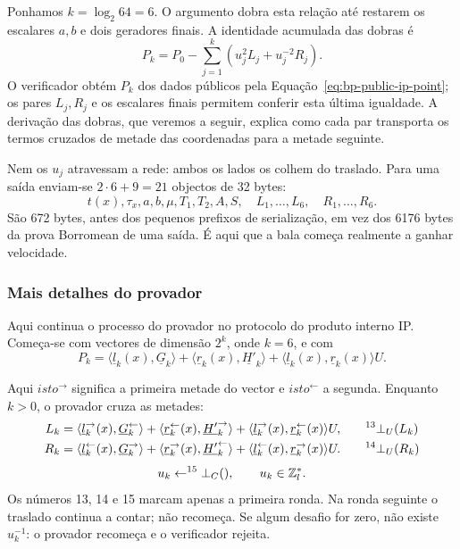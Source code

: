 Ponhamos \(k=\log_2 64=6\). O argumento dobra esta relação até
restarem os escalares \(a,b\) e dois geradores finais. A identidade
acumulada das dobras é
\begin{equation}
 P_k=P_0-\sum_{j=1}^{k}
              \left(u_j^2L_j+u_j^{-2}R_j\right).
 \label{eq:bp-ip-recursion}
\end{equation}
O verificador obtém \(P_k\) dos dados públicos pela
Equação~\eqref{eq:bp-public-ip-point}; os pares \(L_j,R_j\) e os
escalares finais permitem conferir esta última igualdade. A derivação
das dobras, que veremos a seguir, explica como cada par transporta os
termos cruzados de metade das coordenadas para a metade seguinte.

Nem os \(u_j\) atravessam a rede: ambos os lados os colhem do traslado. Para
uma saída enviam-se \(2\cdot6+9=21\) objectos de 32 bytes:
\[
 t(x),\tau_x,a,b,\mu,T_1,T_2,A,S,\quad
 L_1,\ldots,L_6,\quad R_1,\ldots,R_6.
\]
São 672 bytes, antes dos pequenos prefixos de serialização, em vez dos 6176
bytes da prova Borromean de uma saída. É aqui que a bala começa realmente a
ganhar velocidade.

\subsubsection{Mais detalhes do provador}
\label{sec:bullet_detalhes}

Aqui continua o processo do provador no protocolo do produto interno IP.
Começa-se com vectores de dimensão \(2^k\), onde \(k=6\), e com
\[
 P_k=\langle\underline l_k(x),\underline G_k\rangle+
     \langle\underline r_k(x),\underline{H'}_k\rangle+
     \langle\underline l_k(x),\underline r_k(x)\rangle U.
\]

Aqui \(isto^{\rightarrow}\) significa a primeira metade do vector e
\(isto^{\leftarrow}\) a segunda. Enquanto \(k>0\), o provador cruza as metades:
\begin{align*}
L_k={}&
 \langle\underline l_k^{\rightarrow}(x),\underline G_k^{\leftarrow}\rangle+
 \langle\underline r_k^{\leftarrow}(x),\underline{H'}_k^{\rightarrow}\rangle+
 \langle\underline l_k^{\rightarrow}(x),
        \underline r_k^{\leftarrow}(x)\rangle U,
 &\quad&^{13}_{\ }\bot_U(L_k)\\
R_k={}&
 \langle\underline l_k^{\leftarrow}(x),\underline G_k^{\rightarrow}\rangle+
 \langle\underline r_k^{\rightarrow}(x),\underline{H'}_k^{\leftarrow}\rangle+
 \langle\underline l_k^{\leftarrow}(x),
        \underline r_k^{\rightarrow}(x)\rangle U.
 &\quad&^{14}_{\ }\bot_U(R_k)
\end{align*}
\[
 u_k\leftarrow^{15}_{\ }\bot_C(),\qquad u_k\in\mathbb Z_l^*.
\]
Os números 13, 14 e 15 marcam apenas a primeira ronda. Na ronda seguinte o
traslado continua a contar; não recomeça. Se algum desafio for zero, não existe
\(u_k^{-1}\): o provador recomeça e o verificador rejeita.

